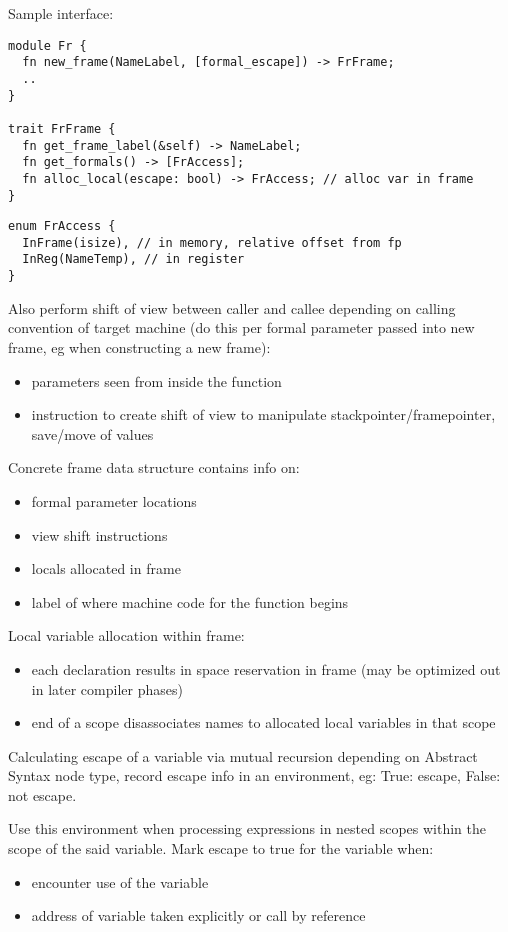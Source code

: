 \documentclass[8pt]{extarticle}
\begin{document}
\begin{multicols*}{2}
  Sample interface:
\begin{verbatim}
module Fr {
  fn new_frame(NameLabel, [formal_escape]) -> FrFrame;
  ..
}

trait FrFrame {
  fn get_frame_label(&self) -> NameLabel;
  fn get_formals() -> [FrAccess];
  fn alloc_local(escape: bool) -> FrAccess; // alloc var in frame
}
\end{verbatim}
  
\begin{verbatim}
enum FrAccess {
  InFrame(isize), // in memory, relative offset from fp
  InReg(NameTemp), // in register
}
\end{verbatim}

  Also perform shift of view between caller and callee depending on calling convention of target machine (do this per formal parameter passed into new frame, eg when constructing a new frame):
  \begin{itemize}
  \item parameters seen from inside the function
  \item instruction to create shift of view to manipulate stackpointer/framepointer, save/move of values
  \end{itemize}

  Concrete frame data structure contains info on:
  \begin{itemize}
  \item formal parameter locations
  \item view shift instructions
  \item locals allocated in frame
  \item label of where machine code for the function begins
  \end{itemize}

  Local variable allocation within frame:
  \begin{itemize}
  \item each declaration results in space reservation in frame (may be optimized out in later compiler phases)
  \item end of a scope disassociates names to allocated local variables in that scope
  \end{itemize}

  Calculating escape of a variable via mutual recursion depending on Abstract Syntax node type, record escape info in an environment, eg: True: escape, False: not escape.
  
  Use this environment when processing expressions in nested scopes within the scope of the said variable. Mark escape to true for the variable when:
  \begin{itemize}
  \item encounter use of the variable
  \item address of variable taken explicitly or call by reference
  \end{itemize}


\end{multicols*}
\end{document}
